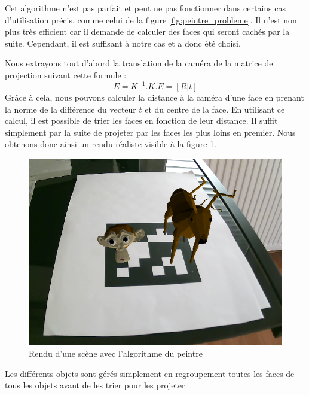                 Cet algorithme n'est pas parfait et peut ne pas fonctionner dans certains cas d'utilisation précis, comme celui de la figure \ref{fig:peintre_probleme}. Il n'est non plus très efficient car il demande de calculer des faces qui seront cachés par la suite. Cependant, il est suffisant à notre cas et a donc été choisi. 

                Nous extrayons tout d'abord la translation de la caméra de la matrice de projection suivant cette formule : 
                \begin{equation*}
                    E = K^{-1}.K.E = [R|t]
                \end{equation*}
                Grâce à cela, nous pouvons calculer la distance à la caméra d'une face en prenant la norme de la différence du vecteur $t$ et du centre de la face. En utilisant ce calcul, il est possible de trier les faces en fonction de leur distance. Il suffit simplement par la suite de projeter par les faces les plus loins en premier. Nous obtenons donc ainsi un rendu réaliste visible à la figure \ref{fig:avec_peintre}.

                \begin{figure}[!h]
                    \centering
                    \includegraphics[scale=0.45]{img/rendu/avec_peintre.png}
                    \caption{Rendu d'une scène avec l'algorithme du peintre}
                    \label{fig:avec_peintre}
                \end{figure}

                Les différents objets sont gérés simplement en regroupement toutes les faces de tous les objets avant de les trier pour les projeter. 

